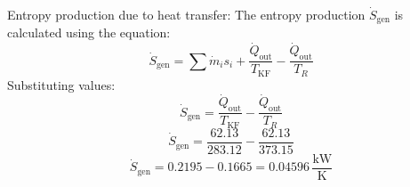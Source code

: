 Entropy production due to heat transfer:  
The entropy production \( \dot{S}_{\text{gen}} \) is calculated using the equation:  
\[
\dot{S}_{\text{gen}} = \sum \dot{m}_i s_i + \frac{\dot{Q}_{\text{out}}}{T_{\text{KF}}} - \frac{\dot{Q}_{\text{out}}}{T_R}
\]  
Substituting values:  
\[
\dot{S}_{\text{gen}} = \frac{\dot{Q}_{\text{out}}}{T_{\text{KF}}} - \frac{\dot{Q}_{\text{out}}}{T_R}
\]  
\[
\dot{S}_{\text{gen}} = \frac{62.13}{283.12} - \frac{62.13}{373.15}
\]  
\[
\dot{S}_{\text{gen}} = 0.2195 - 0.1665 = 0.04596 \, \frac{\text{kW}}{\text{K}}
\]